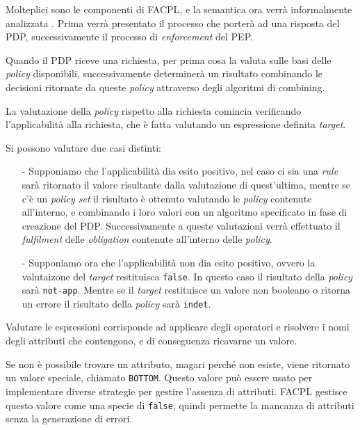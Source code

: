 Molteplici sono le componenti di FACPL, e la semantica ora verrà informalmente analizzata \cite{fullfacpl}.
Prima verrà presentato il processo che porterà ad una risposta del PDP, successivamente il processo di \textit{enforcement} del PEP.\\ \par
Quando il PDP riceve una richiesta, per prima cosa la valuta sulle basi delle \textit{policy} disponibili, successivamente determinerà un risultato combinando le decisioni ritornate da queste \textit{policy} attraverso degli algoritmi di combining.\\ \par
La valutazione della \textit{policy} rispetto alla richiesta comincia verificando l'applicabilità alla richiesta, che è fatta valutando un espressione definita \textit{target}.\\ \par
Si possono valutare due casi distinti:
\begin{itemize}
\item[-] Supponiamo che l'applicabilità dia esito positivo, nel caso ci sia una \textit{rule} sarà ritornato il valore risultante dalla valutazione di quest'ultima, mentre se c'è un \textit{policy set} il risultato è ottenuto valutando le \textit{policy} contenute all'interno, e combinando i loro valori con un algoritmo specificato in fase di creazione del PDP. Successivamente a queste valutazioni verrà effettuato il \textit{fulfilment} delle \textit{obligation} contenute all'interno delle \textit{policy}.
\item[-] Supponiamo ora che l'applicabilità non dia esito positivo, ovvero la valutaizone del \textit{target} restituisca \texttt{false}. In questo caso il risultato della \textit{policy} sarà \texttt{not-app}. Mentre se il \textit{target} restituisce un valore non booleano o ritorna un errore il risultato della \textit{policy} sarà \texttt{indet}.
\end{itemize}
Valutare le espressioni corrisponde ad applicare degli operatori e risolvere i nomi degli attributi che contengono, e di conseguenza ricavarne un valore.\\ \par
Se non è possibile trovare un attributo, magari perché non esiste, viene ritornato un valore speciale, chiamato \texttt{BOTTOM}. Questo valore può essere usato per implementare diverse strategie per gestire l'assenza di attributi. FACPL gestisce questo valore come una specie di \texttt{false}, quindi permette la mancanza di attributi senza la generazione di errori.\\ \par
